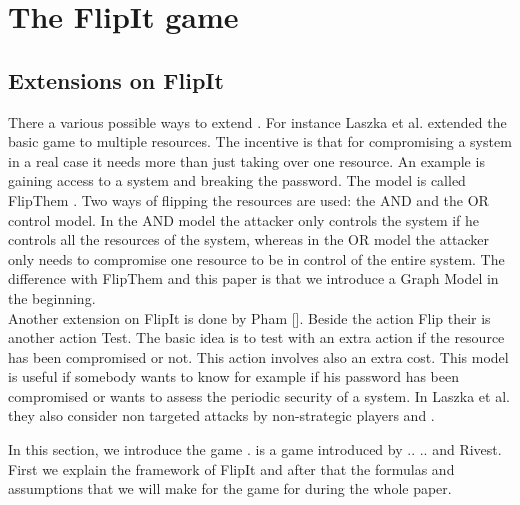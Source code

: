 \chapter{The FlipIt game}
\label{cha:2}


\section{Extensions on FlipIt}


There a various possible ways to extend . For instance Laszka et al. extended the basic  game to multiple resources. The incentive is that for compromising a system in a real case it needs more than just taking over one resource. An example is gaining access to a system and breaking the password. The model is called FlipThem \cite{FlipThem}. Two ways of flipping the resources are used: the AND and the OR control model. In the AND model the attacker only controls the system if he controls all the resources of the system, whereas in the OR model the attacker only needs to compromise one resource to be in control of the entire system. The difference with FlipThem and this paper is that we introduce a Graph Model in the beginning.\\
Another extension on FlipIt is done by Pham\cite{GameTheorApprCostBenefitAnalyses} []. Beside the action Flip their is another action Test. The basic idea is to test with an extra action if the resource has been compromised or not. This action involves also an extra cost. This model is useful if somebody wants to know for example if his password has been compromised or wants to assess the periodic security of a system.  In \cite{MitigationCovert} \cite{MitigationNonTargeted} Laszka et al. they also consider non targeted attacks by non-strategic players and . 








In this section, we introduce the game  \cite{FlipIt}.  is a game introduced by .. .. and Rivest. First we explain the framework of FlipIt and after that the formulas and assumptions that we will make for the game for during the whole paper.  

